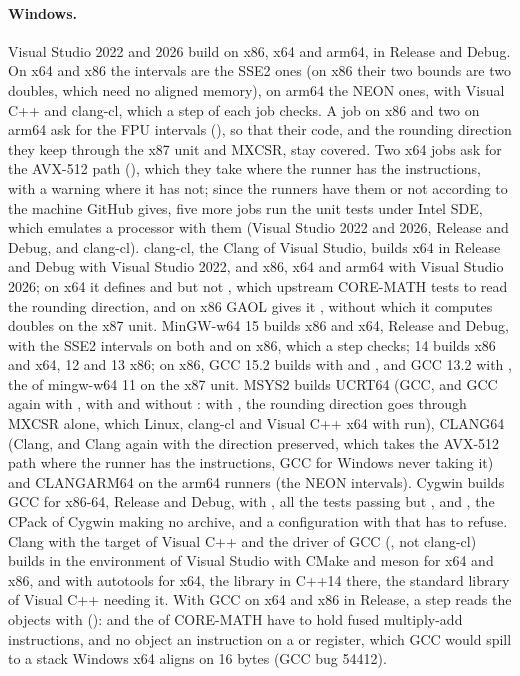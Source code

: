 \documentclass[12pt,a4paper,twoside,openright]{book}
\begin{document}
\paragraph{Windows.} Visual Studio 2022 and 2026 build on x86, x64 and
arm64, in Release and Debug. On x64 and x86 the intervals are the SSE2 ones
(on x86 their two bounds are two doubles, which need no aligned memory), on
arm64 the NEON ones, with Visual C++ and clang-cl, which a step of each job
checks.\newinvfive{} A job on x86 and two on arm64 ask for the FPU intervals
(), so that their code, and the rounding direction
they keep through the x87 unit and MXCSR, stay covered. Two x64 jobs ask for
the AVX-512 path (), which they take where the
runner has the instructions, with a warning where it has not; since the
runners have them or not according to the machine GitHub gives, five more
jobs run the unit tests under Intel SDE, which emulates a processor with them
(Visual Studio 2022 and 2026, Release and Debug, and clang-cl). clang-cl,
the Clang of Visual Studio, builds x64 in Release and Debug with Visual
Studio 2022, and x86, x64 and arm64 with Visual Studio 2026; on x64 it
defines  and  but not ,
which upstream CORE-MATH tests to read the rounding direction, and on x86
GAOL gives it , without which it computes doubles on the x87
unit. MinGW-w64 15 builds x86 and x64, Release and Debug, with the SSE2
intervals on both and  on x86, which a step checks;
14 builds x86 and x64, 12 and 13 x86; on x86, GCC 15.2 builds with
 and , and GCC 13.2 with
, the  of mingw-w64 11 on the x87 unit.
MSYS2 builds UCRT64 (GCC, and GCC again with
, with and without : with
, the rounding direction goes through MXCSR alone, which
Linux, clang-cl and Visual C++ x64 with  run), CLANG64
(Clang, and Clang again with the direction preserved, which takes the
AVX-512 path where the runner has the instructions, GCC for Windows never
taking it) and CLANGARM64 on the arm64 runners (the NEON intervals). Cygwin
builds GCC for x86-64, Release and Debug, with
, all the tests passing but
,  and , the
CPack of Cygwin making no archive, and a configuration with
 that  has to
refuse.\newinvfive{} Clang with the target of Visual C++ and the driver of
GCC (, not clang-cl) builds in the environment of Visual Studio
with CMake and meson for x64 and x86, and with autotools for x64, the
library in C++14 there, the standard library of Visual C++ needing it. With
GCC on x64 and x86 in Release, a step reads the objects with 
():
 and the  of CORE-MATH
have to hold fused multiply-add
instructions, and no object an instruction on a  or 
register, which GCC would spill to a stack Windows x64 aligns on 16 bytes
(GCC bug 54412).
\end{document}
